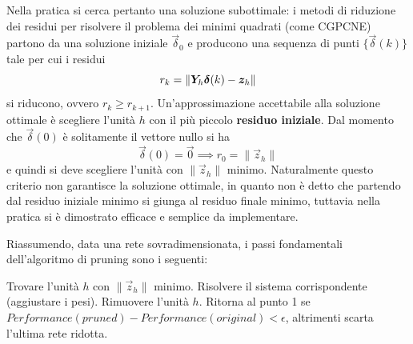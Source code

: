 Nella pratica si cerca pertanto una soluzione subottimale: i metodi di riduzione dei residui per risolvere il problema dei minimi quadrati (come CGPCNE) partono da una soluzione iniziale $\vec{\delta}_0$ e producono una sequenza di punti $\{ \vec{\delta}(k) \}$ tale per cui i residui
\begin{displaymath}
	r_k = \|\mat{Y}_h \vec{\delta}(k) - \vec{z}_h\|
\end{displaymath}
si riducono, ovvero $r_k \geq r_{k + 1}$. Un'approssimazione accettabile alla soluzione ottimale è scegliere l'unità $h$ con il più piccolo \textbf{residuo iniziale}. Dal momento che $\vec{\delta}(0)$ è solitamente il vettore nullo si ha
\begin{displaymath}
	\vec{\delta}(0) = \vec{0} \implies r_0 = \| \vec{z}_h \|
\end{displaymath}
e quindi si deve scegliere l'unità con $\| \vec{z}_h \|$ minimo. Naturalmente questo criterio non garantisce la soluzione ottimale, in quanto non è detto che partendo dal residuo iniziale minimo si giunga al residuo finale minimo, tuttavia nella pratica si è dimostrato efficace e semplice da implementare.

Riassumendo, data una rete sovradimensionata, i passi fondamentali dell'algoritmo di pruning sono i seguenti:
\begin{algorithmic}[1]
	\State Trovare l'unità $h$ con $\| \vec{z}_h \|$ minimo.
	\State Risolvere il sistema corrispondente (aggiustare i pesi).
	\State Rimuovere l'unità $h$.
	\State Ritorna al punto 1 se $Performance(pruned) - Performance(original) < \epsilon$, altrimenti scarta l'ultima rete ridotta.
\end{algorithmic}
